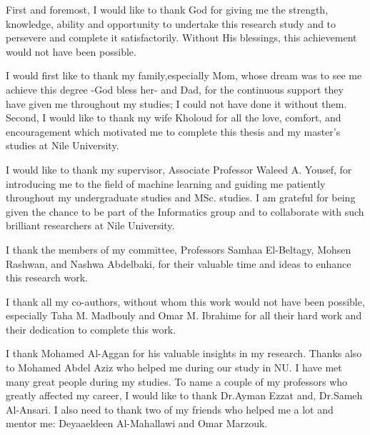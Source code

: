 


\newpage
{}

First and foremost, I would like to thank God for giving me the strength, knowledge, ability and opportunity to undertake this research study and to persevere and complete it satisfactorily. Without His blessings, this achievement would not have been possible. 

I would first like to thank my family,especially Mom, whose dream was to see me achieve this degree -God bless her- and Dad, for the continuous support they have given me throughout my studies; I could not have done it without them. Second, I would like to thank my wife Kholoud for all the love, comfort, and encouragement which motivated me to complete this thesis and my master’s studies at Nile University. 

I would like to thank my supervisor, Associate Professor Waleed A. Yousef, for introducing me to the field of machine learning and guiding me patiently throughout my undergraduate studies and MSc. studies. I am grateful for being given the chance to be part of the Informatics group and to collaborate with such brilliant researchers at Nile University.

I thank the members of my committee, Professors Samhaa El-Beltagy, Mohsen Rashwan, and Nashwa Abdelbaki, for their valuable time and ideas to enhance this research work. 

I thank all my co-authors, without whom this work would not have been possible, especially Taha M. Madbouly and Omar M. Ibrahime for all their hard work and their dedication to complete this work. 

I thank Mohamed Al-Aggan for his valuable insights in my research. Thanks also to Mohamed Abdel Aziz who helped me during our study in NU. I have met many great people during my studies. To name a couple of my professors who greatly affected my career, I would like to thank Dr.Ayman Ezzat and, Dr.Sameh Al-Ansari. I also need to thank two of my friends who helped me a lot and mentor me: Deyaaeldeen Al-Mahallawi and Omar Marzouk.


